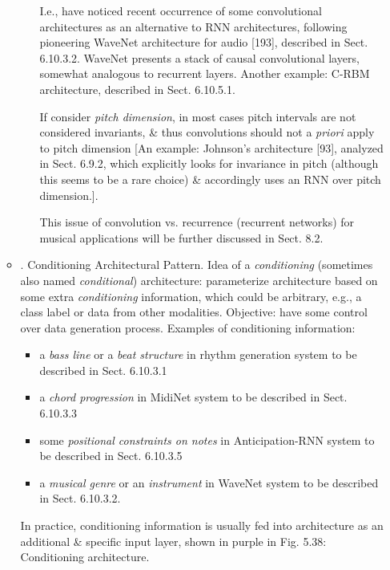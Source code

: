 \documentclass{article}
\begin{document}
\begin{itemize}
\begin{itemize}
\begin{itemize}
			I.e., have noticed recent occurrence of some convolutional architectures as an alternative to RNN architectures, following pioneering WaveNet architecture for audio [193], described in Sect. 6.10.3.2. WaveNet presents a stack of causal convolutional layers, somewhat analogous to recurrent layers. Another example: C-RBM architecture, described in Sect. 6.10.5.1.
			
			If consider {\it pitch dimension}, in most cases pitch intervals are not considered invariants, \& thus convolutions should not a {\it priori} apply to pitch dimension [An example: {\sc Johnson}'s architecture [93], analyzed in Sect. 6.9.2, which explicitly looks for invariance in pitch (although this seems to be a rare choice) \& accordingly uses an RNN over pitch dimension.].
			
			This issue of convolution vs. recurrence (recurrent networks) for musical applications will be further discussed in Sect. 8.2.
		\end{itemize}
		\item {. Conditioning Architectural Pattern.} Idea of a {\it conditioning} (sometimes also named {\it conditional}) architecture: parameterize architecture based on some extra {\it conditioning} information, which could be arbitrary, e.g., a class label or data from other modalities. Objective: have some control over data generation process. Examples of conditioning information:
		\begin{itemize}
			\item a {\it bass line} or a {\it beat structure} in rhythm generation system to be described in Sect. 6.10.3.1
			\item a {\it chord progression} in MidiNet system to be described in Sect. 6.10.3.3
			\item some {\it positional constraints on notes} in Anticipation-RNN system to be described in Sect. 6.10.3.5
			\item a {\it musical genre} or an {\it instrument} in WaveNet system to be described in Sect. 6.10.3.2.
		\end{itemize}
		In practice, conditioning information is usually fed into architecture as an additional \& specific input layer, shown in purple in {\sf Fig. 5.38: Conditioning architecture}.
		

\end{itemize}
\end{itemize}
\end{document}

